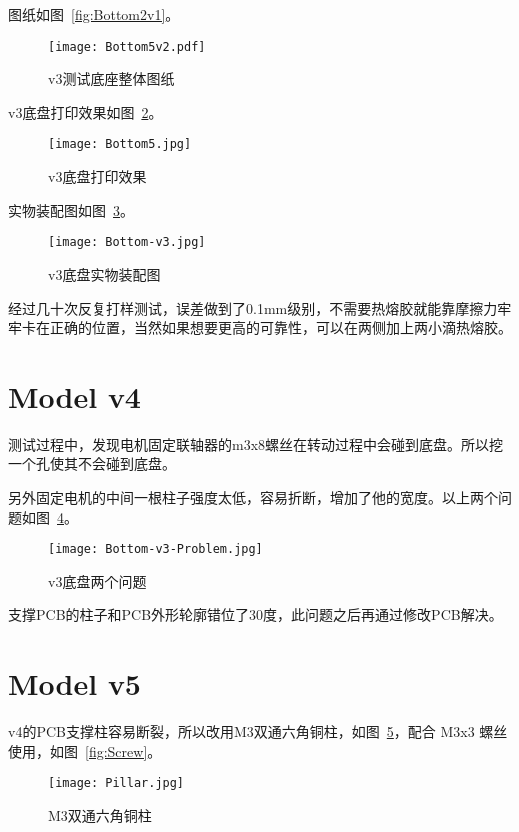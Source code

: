 图纸如图~\ref{fig:Bottom2v1}。

\begin{figure}[htbp]
    \centering
    \texttt{[image: Bottom5v2.pdf]}
    \caption{v3测试底座整体图纸}
    \label{fig:Bottom5v2}
\end{figure}

v3底盘打印效果如图~\ref{fig:Bottom5}。

\begin{figure}[htbp]
    \centering
    \texttt{[image: Bottom5.jpg]}
    \caption{v3底盘打印效果}
    \label{fig:Bottom5}
\end{figure}

实物装配图如图~\ref{fig:Bottom-v3}。

\begin{figure}[htbp]
    \centering
    \texttt{[image: Bottom-v3.jpg]}
    \caption{v3底盘实物装配图}
    \label{fig:Bottom-v3}
\end{figure}

经过几十次反复打样测试，误差做到了0.1mm级别，不需要热熔胶就能靠摩擦力牢牢卡在正确的位置，当然如果想要更高的可靠性，可以在两侧加上两小滴热熔胶。

\section{Model v4}

测试过程中，发现电机固定联轴器的m3x8螺丝在转动过程中会碰到底盘。所以挖一个孔使其不会碰到底盘。

另外固定电机的中间一根柱子强度太低，容易折断，增加了他的宽度。以上两个问题如图~\ref{fig:Bottom-v3-Problem}。

\begin{figure}[htbp]
    \centering
    \texttt{[image: Bottom-v3-Problem.jpg]}
    \caption{v3底盘两个问题}
    \label{fig:Bottom-v3-Problem}
\end{figure}

支撑PCB的柱子和PCB外形轮廓错位了30度，此问题之后再通过修改PCB解决。

\section{Model v5}

v4的PCB支撑柱容易断裂，所以改用M3双通六角铜柱，如图~\ref{fig:Pillar}，配合 M3x3 螺丝使用，如图~\ref{fig:Screw}。

\begin{figure}[htbp]
    \centering
    \texttt{[image: Pillar.jpg]}
    \caption{M3双通六角铜柱}
    \label{fig:Pillar}
\end{figure}

